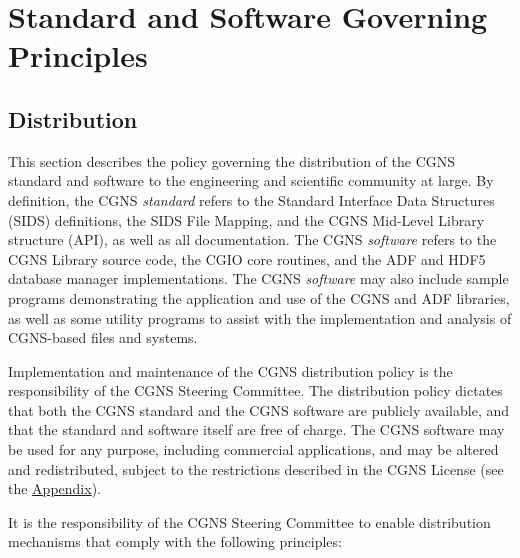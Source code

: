 \section{Standard and Software Governing Principles}
\label{s:principles}
\thispagestyle{plain}

\subsection{Distribution}
\label{s:distribution}

This section describes the policy governing the distribution of the
CGNS standard and software to the engineering and scientific community
at large.
By definition, the CGNS \textit{standard} refers to the
Standard Interface Data Structures
(SIDS) definitions, the SIDS File Mapping, and the CGNS Mid-Level
Library structure (API), as well as all documentation.
The CGNS \textit{software} refers to the CGNS
Library source code, the CGIO core routines,
and the ADF and HDF5 database manager implementations.
The CGNS \textit{software} may also include sample programs
demonstrating the application and use of the CGNS and ADF libraries,
as well as some utility programs to assist with the implementation and
analysis of CGNS-based files and systems.

Implementation and maintenance of the CGNS distribution policy is the
responsibility of the CGNS Steering Committee.
The distribution policy dictates that both the CGNS standard and the
CGNS software are publicly available, and that the standard and software
itself are free of charge.
The CGNS software may be used for any purpose, including commercial
applications, and may be altered and redistributed, subject to the
restrictions described in the CGNS License (see the
\hyperref[s:license]{Appendix}).

It is the responsibility of the CGNS Steering Committee to enable
distribution mechanisms that comply with the following principles:

